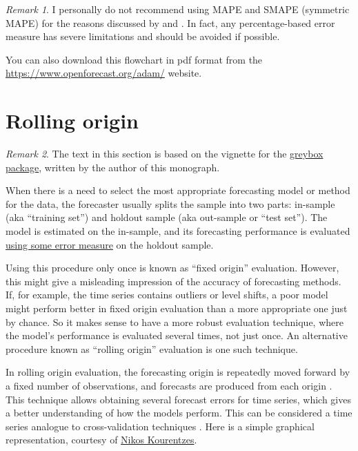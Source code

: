 \documentclass[]{book}
\theoremstyle{definition}
\theoremstyle{definition}
\theoremstyle{definition}
\theoremstyle{definition}
\theoremstyle{remark}
\newtheorem*{remark}{Remark}
\begin{document}
\begin{remark}
I personally do not recommend using MAPE and SMAPE (symmetric MAPE) for the reasons discussed by \citet{Goodwin1999} and \citet{Hyndman2006}. In fact, any percentage-based error measure has severe limitations and should be avoided if possible.
\end{remark}

You can also download this flowchart in pdf format from the \href{https://www.openforecast.org/adam/images/errorMeasuresFlowChart-v2.pdf}{https://www.openforecast.org/adam/} website.

\hypertarget{rollingOrigin}{%
\section{Rolling origin}\label{rollingOrigin}}

\begin{remark}
The text in this section is based on the vignette for the \href{https://cran.r-project.org/package=greybox}{greybox package}, written by the author of this monograph.
\end{remark}

When there is a need to select the most appropriate forecasting model or method for the data, the forecaster usually splits the sample into two parts: in-sample (aka ``training set'') and holdout sample (aka out-sample or ``test set''). The model is estimated on the in-sample, and its forecasting performance is evaluated \protect\hyperlink{errorMeasures}{using some error measure} on the holdout sample.

Using this procedure only once is known as ``fixed origin'' evaluation. However, this might give a misleading impression of the accuracy of forecasting methods. If, for example, the time series contains outliers or level shifts, a poor model might perform better in fixed origin evaluation than a more appropriate one just by chance. So it makes sense to have a more robust evaluation technique, where the model's performance is evaluated several times, not just once. An alternative procedure known as ``rolling origin'' evaluation is one such technique.

In rolling origin evaluation, the forecasting origin is repeatedly moved forward by a fixed number of observations, and forecasts are produced from each origin \citep{Tashman2000}. This technique allows obtaining several forecast errors for time series, which gives a better understanding of how the models perform. This can be considered a time series analogue to cross-validation techniques \citep{WikipediaCrossValidation2020}. Here is a simple graphical representation, courtesy of \href{https://kourentzes.com/forecasting/}{Nikos Kourentzes}.
\end{document}
